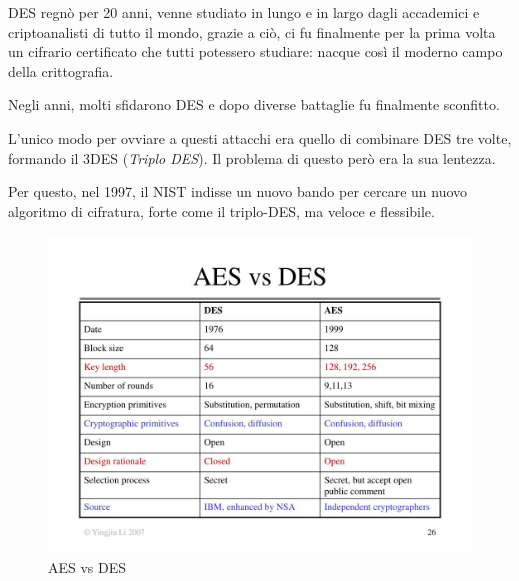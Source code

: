 

\textsf{\small DES regnò per 20 anni, venne studiato in lungo e in largo dagli accademici e criptoanalisti di tutto il mondo, grazie a ciò, ci fu finalmente per la prima volta un cifrario certificato che tutti potessero studiare: nacque così il moderno campo della crittografia.} %


\textsf{\small Negli anni, molti sfidarono DES e dopo diverse battaglie fu finalmente sconfitto.} %

 

\textsf{\small L'unico modo per ovviare a questi attacchi era quello di combinare DES tre volte, formando il 3DES (\emph{Triplo DES}). Il problema di questo però era la sua lentezza.} %


\textsf{\small Per questo, nel 1997, il NIST indisse un nuovo bando per cercare un nuovo algoritmo di cifratura, forte come il triplo-DES, ma veloce e flessibile.}

\begin{figure}[H]
	\centering
	\includegraphics[width=1\textwidth, height=1\textheight, keepaspectratio]{./images/des_vs_aes/aes-vs-des.png}
	\caption{AES vs DES}
	\label{fig:aes_vs_des}
\end{figure}

